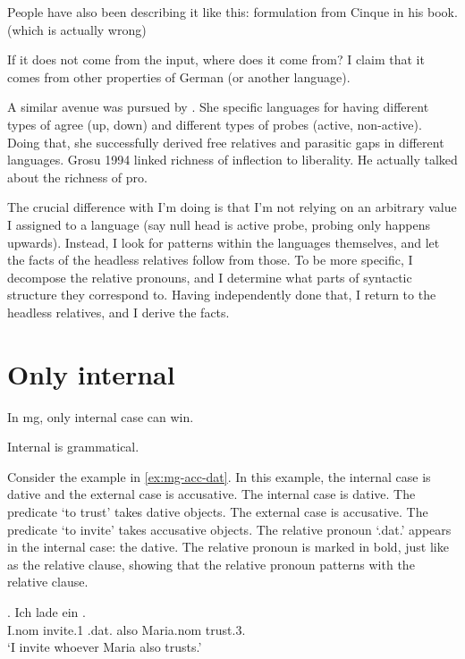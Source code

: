 People have also been describing it like this: formulation from Cinque in his book. (which is actually wrong)

If it does not come from the input, where does it come from? I claim that it comes from other properties of German (or another language).

A similar avenue was pursued by \citealt{himmelreich2017}. She specific languages for having different types of agree (up, down) and different types of probes (active, non-active). Doing that, she successfully derived free relatives and parasitic gaps in different languages. Grosu 1994 linked richness of inflection to liberality. He actually talked about the richness of pro.


The crucial difference with I'm doing is that I'm not relying on an arbitrary value I assigned to a language (say null head is active probe, probing only happens upwards). Instead, I look for patterns within the languages themselves, and let the facts of the headless relatives follow from those. To be more specific, I decompose the relative pronouns, and I determine what parts of syntactic structure they correspond to. Having independently done that, I return to the headless relatives, and I derive the facts.



\section{Only internal}

In \ac{mg}, only internal case can win.

Internal is grammatical.

Consider the example in \ref{ex:mg-acc-dat}. In this example, the internal case is dative and the external case is accusative.
The internal case is dative. The predicate  `to trust' takes dative objects.
The external case is accusative. The predicate  `to invite' takes accusative objects.
The relative pronoun  `.\ac{dat}.' appears in the internal case: the dative. The relative pronoun is marked in bold, just like as the relative clause, showing that the relative pronoun patterns with the relative clause.

\exg. Ich {lade ein}    . \\
I.\ac{nom} invite.1\scsub{[acc]} .\ac{dat}. also Maria.\ac{nom} trust.3\scsub{[dat]}.\\
`I invite whoever Maria also trusts.' \label{ex:mg-acc-dat}

